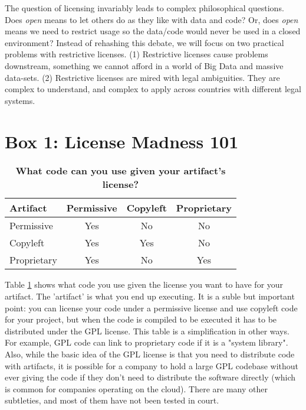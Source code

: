 \documentclass[letterpaper]{article}
\begin{document}
The question of licensing invariably leads to complex philosophical questions.
Does \emph{open} means to let others do as they like with data and code? Or,
does \emph{open} means we need to restrict usage so the data/code would never
be used in a closed environment? Instead of rehashing this debate, we will
focus on two practical problems with restrictive licenses. (1) Restrictive
licenses cause problems downstream, something we cannot afford in a world of
Big Data and massive data-sets. (2) Restrictive licenses are mired with legal
ambiguities. They are complex to understand, and complex to apply across
countries with different legal systems.

\section{Box 1: License Madness 101}

\begin{table}
  \centering
  \caption{\bf{What code can you use given your artifact's license?}}
  \begin{tabular}{|l|ccc|}
  \hline
  Artifact              & Permissive & Copyleft & Proprietary \\
  \hline
  Permissive            & Yes        & No       & No          \\
  Copyleft              & Yes        & Yes      & No          \\
  Proprietary           & Yes        & No       & Yes         \\
  \hline
  \end{tabular}
  \label{table:codelicenses}
\end{table}

Table \ref{table:codelicenses} shows what code you use given the license you
want to have for your artifact. The 'artifact' is what you end up executing.
It is a suble but important point: you can license your code under a permissive
license and use copyleft code for your project, but when the code is compiled
to be executed it has to be distributed under the GPL license. This table is a
simplification in other ways. For example, GPL code can link to proprietary
code if it is a "system library". Also, while the basic idea of the GPL license is
that you need to distribute code with artifacts, it is possible for a company
to hold a large GPL codebase without ever giving the code if they don't need to
distribute the software directly (which is common for companies operating on
the cloud). There are many other subtleties, and most of them have not been
tested in court.
\end{document}
